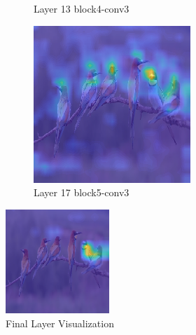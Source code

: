 \begin{figure}
\begin{subfigure}[b]{0.30\textwidth}
         \caption{Layer 13 block4-conv3}
         \label{fig:layer-13}
     \end{subfigure}
     \begin{subfigure}[b]{0.30\textwidth}
         \centering
         \includegraphics[width=\textwidth]{images/hm-layer-13.png}
         \caption{Layer 17 block5-conv3}
         \label{fig:layer-17}
     \end{subfigure}
    
    \label{fig:three graphs}
    
    \vspace{.5em}%
    \includegraphics[width=0.35\textwidth]{images/hm-layer-17.png}
    \vspace{1em}%
    \caption{Final Layer Visualization}
    \label{fig:DeepViz - Visual Explanation Tool}

\end{figure}


